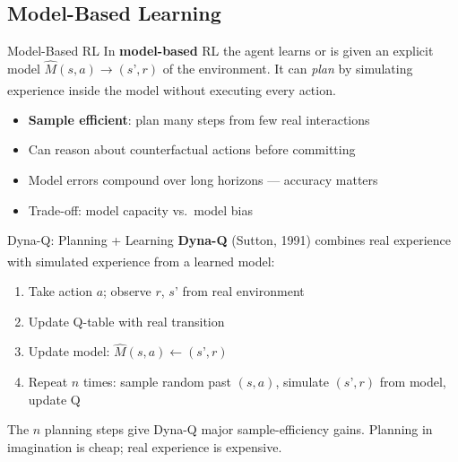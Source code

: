     \subsection{Model-Based Learning}

\begin{v3topic}{Model-Based RL}
    In \textbf{model-based} RL the agent learns or is given an explicit model
    $\hat{M}(s,a) \to (s’, r)$ of the environment. It can \emph{plan} by
    simulating experience inside the model without executing every
    action.\textsuperscript{\cite[][p.~348]{hurbansGrokkingArtificialIntelligence2020}}

    \begin{itemize}
        \item \textbf{Sample efficient}: plan many steps from few real interactions
        \item Can reason about counterfactual actions before committing
        \item Model errors compound over long horizons --- accuracy matters
        \item Trade-off: model capacity vs.\ model bias
    \end{itemize}

\end{v3topic}
\begin{v3topic}{Dyna-Q: Planning + Learning}
    \textbf{Dyna-Q} (Sutton, 1991) combines real experience with simulated
    experience from a learned
    model:\textsuperscript{\cite[][Ch.~8]{suttonReinforcementLearningIntroduction2018}}

    \begin{enumerate}
        \item Take action $a$; observe $r$, $s’$ from real environment
        \item Update Q-table with real transition
        \item Update model: $\hat{M}(s,a) \leftarrow (s’,r)$
        \item Repeat $n$ times: sample random past $(s,a)$, simulate
              $(s’,r)$ from model, update Q
    \end{enumerate}

    The $n$ planning steps give Dyna-Q major sample-efficiency gains.
    Planning in imagination is cheap; real experience is expensive.

\end{v3topic}
